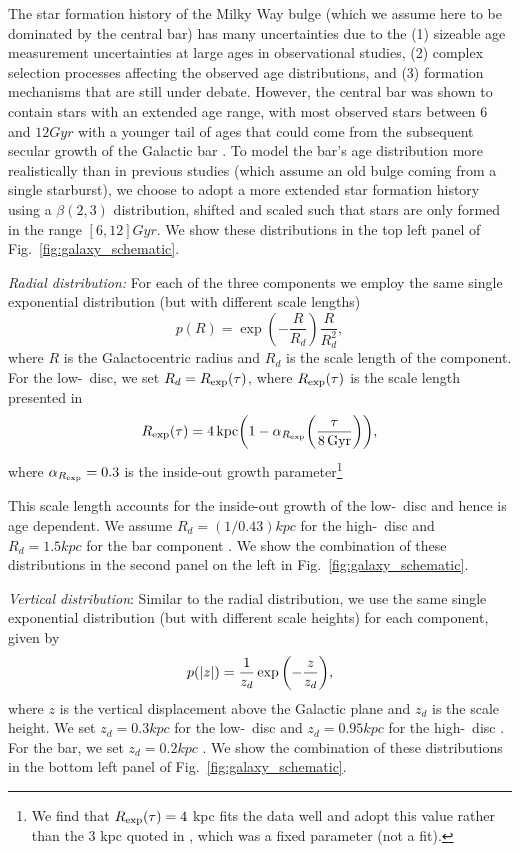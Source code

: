 The star formation history of the Milky Way bulge (which we assume here to be dominated by the central bar) has many uncertainties due to the (1) sizeable age measurement uncertainties at large ages in observational studies, (2) complex selection processes affecting the observed age distributions, and (3) formation mechanisms that are still under debate. However, the central bar was shown to contain stars with an extended age range, with most observed stars between $6$ and $12 \unit{Gyr}$ with a younger tail of ages that could come from the subsequent secular growth of the Galactic bar \citep[e.g.,][]{Bovy+2019}. To model the bar's age distribution more realistically than in previous studies (which assume an old bulge coming from a single starburst), we choose to adopt a more extended star formation history using a $\beta(2,3)$ distribution, shifted and scaled such that stars are only formed in the range $[6, 12] \unit{Gyr}$. We show these distributions in the top left panel of Fig.~\ref{fig:galaxy_schematic}.

\textit{Radial distribution:} For each of the three components we employ the same single exponential distribution (but with different scale lengths)
\begin{equation}\label{eq:galaxy_R}
    p(R) = \exp(-\frac{R}{R_d}) \frac{R}{R_d^2},
\end{equation}
where $R$ is the Galactocentric radius and $R_d$ is the scale length of the component. For the low-\achem~disc, we set $R_d = R_{\rm exp}(\tau)$, where $R_{\rm exp}(\tau)$ is the scale length presented in \citet[][Eq.~6]{Frankel+2018}
\begin{equation}
    R_{\rm exp}(\tau) = 4 \unit{kpc} \qty(1 - \alpha_{R_{\rm exp}} \qty(\frac{\tau}{8 \unit{Gyr}})),
\end{equation}
where $\alpha_{R_{\rm exp}} = 0.3$ is the inside-out growth parameter\footnote{We find that $R_{\rm exp}(\tau) = 4$ kpc fits the data well and adopt this value rather than the 3 kpc quoted in \cite{Frankel+2018}, which was a fixed parameter (not a fit).}

This scale length accounts for the inside-out growth of the low-\achem~disc and hence is age dependent. We assume $R_d = (1 / 0.43) \unit{kpc}$ for the high-\achem~disc \citep[][Table~1]{Bovy+2016} and $R_d = 1.5 \unit{kpc}$ for the bar component \citep{Bovy+2019}. We show the combination of these distributions in the second panel on the left in Fig.~\ref{fig:galaxy_schematic}.

\textit{Vertical distribution}: Similar to the radial distribution, we use the same single exponential distribution (but with different scale heights) for each component, given by
\begin{equation}\label{eq:galaxy_z}
    p(\abs{z}) = \frac{1}{z_d} \exp\qty(-\frac{z}{z_d}),
\end{equation}
where $z$ is the vertical displacement above the Galactic plane and $z_d$ is the scale height. We set $z_d = 0.3 \unit{kpc}$ for the low-\achem~disc \citep{McMillan+2011} and $z_d = 0.95 \unit{kpc}$ for the high-\achem~disc \citep{Bovy+2016}. For the bar, we set $z_d = 0.2 \unit{kpc}$ \citep{Wegg+15}. We show the combination of these distributions in the bottom left panel of Fig.~\ref{fig:galaxy_schematic}.

